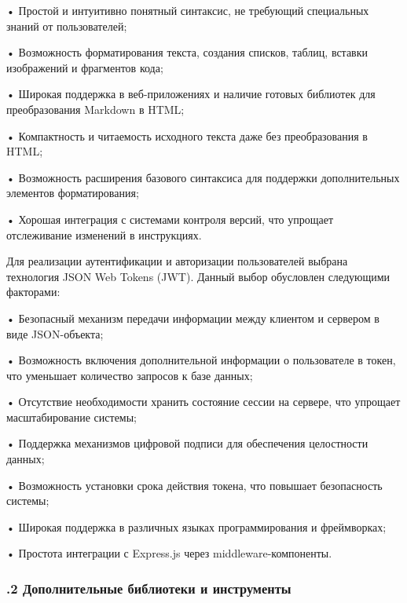 {  \par \redline • Простой и интуитивно понятный синтаксис, не требующий специальных знаний от пользователей;
  \par \redline • Возможность форматирования текста, создания списков, таблиц, вставки изображений и фрагментов кода;
  \par \redline • Широкая поддержка в веб-приложениях и наличие готовых библиотек для преобразования Markdown в HTML;
  \par \redline • Компактность и читаемость исходного текста даже без преобразования в HTML;
  \par \redline • Возможность расширения базового синтаксиса для поддержки дополнительных элементов форматирования;
  \par \redline • Хорошая интеграция с системами контроля версий, что упрощает отслеживание изменений в инструкциях.

  \par \redline Для реализации аутентификации и авторизации пользователей выбрана технология JSON Web Tokens (JWT). Данный выбор обусловлен следующими факторами:
  
  \par \redline • Безопасный механизм передачи информации между клиентом и сервером в виде JSON-объекта;
  \par \redline • Возможность включения дополнительной информации о пользователе в токен, что уменьшает количество запросов к базе данных;
  \par \redline • Отсутствие необходимости хранить состояние сессии на сервере, что упрощает масштабирование системы;
  \par \redline • Поддержка механизмов цифровой подписи для обеспечения целостности данных;
  \par \redline • Возможность установки срока действия токена, что повышает безопасность системы;
  \par \redline • Широкая поддержка в различных языках программирования и фреймворках;
  \par \redline • Простота интеграции с Express.js через middleware-компоненты.

  \par
}

\subtitlespace

\subsubsection*{ 
  \gostTitleFont
  .2 Дополнительные библиотеки и инструменты
} 

